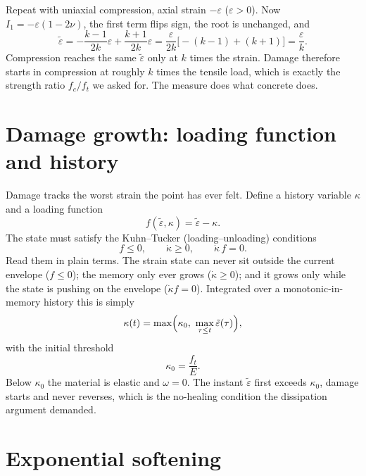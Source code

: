 \documentclass[11pt]{article}
\newcommand{\eqs}{\tilde{\varepsilon}}
\begin{document}
Repeat with uniaxial compression, axial strain $-\varepsilon$ ($\varepsilon>0$). Now
$I_1=-\varepsilon(1-2\nu)$, the first term flips sign, the root is unchanged, and
%
\begin{equation}
\eqs = -\frac{k-1}{2k}\varepsilon + \frac{k+1}{2k}\varepsilon
     = \frac{\varepsilon}{2k}\bigl[-(k-1)+(k+1)\bigr] = \frac{\varepsilon}{k}.
\end{equation}
%
Compression reaches the same $\eqs$ only at $k$ times the strain. Damage therefore starts
in compression at roughly $k$ times the tensile load, which is exactly the strength ratio
$f_c/f_t$ we asked for. The measure does what concrete does.

\section{Damage growth: loading function and history}

Damage tracks the worst strain the point has ever felt. Define a history variable $\kappa$
and a loading function
%
\begin{equation}
f(\eqs,\kappa) = \eqs - \kappa .
\end{equation}
%
The state must satisfy the Kuhn--Tucker (loading--unloading) conditions
%
\begin{equation}
f \le 0, \qquad \dot\kappa \ge 0, \qquad \dot\kappa\, f = 0 .
\end{equation}
%
Read them in plain terms. The strain state can never sit outside the current envelope
($f\le 0$); the memory only ever grows ($\dot\kappa\ge0$); and it grows only while the
state is pushing on the envelope ($\dot\kappa f=0$). Integrated over a monotonic-in-memory
history this is simply
%
\begin{equation}
\kappa(t) = \max\Bigl(\kappa_0,\ \max_{\tau\le t}\eqs(\tau)\Bigr),
\label{eq:history}
\end{equation}
%
with the initial threshold
%
\begin{equation}
\kappa_0 = \frac{f_t}{E}.
\end{equation}
%
Below $\kappa_0$ the material is elastic and $\omega=0$. The instant $\eqs$ first exceeds
$\kappa_0$, damage starts and never reverses, which is the no-healing condition the
dissipation argument demanded.

\section{Exponential softening}
\end{document}
